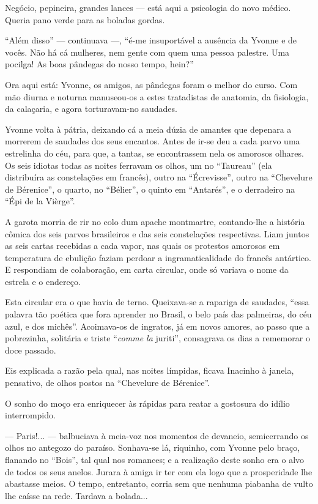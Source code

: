 Negócio, pepineira, grandes lances --- está aqui a psicologia do novo
médico. Queria pano verde para as boladas gordas.

``Além disso'' --- continuava ---, ``é-me insuportável a ausência da
Yvonne e de vocês. Não há cá mulheres, nem gente com quem uma pessoa
palestre. Uma pocilga! As boas pândegas do nosso tempo, hein?''

Ora aqui está: Yvonne, os amigos, as pândegas foram o melhor do curso.
Com mão diurna e noturna manuseou-os a estes tratadistas de anatomia, da
fisiologia, da calaçaria, e agora torturavam-no saudades.

Yvonne volta à pátria, deixando cá a meia dúzia de amantes que depenara
a morrerem de saudades dos seus encantos. Antes de ir-se deu a cada
parvo uma estrelinha do céu, para que, a tantas, se encontrassem nela os
amorosos olhares. Os seis idiotas todas as noites ferravam os olhos, um
no ``Taureau'' (ela distribuíra as constelações em francês), outro na
``Écrevisse'', outro na ``Chevelure de Bérenice'', o quarto, no
``Bélier'', o quinto em ``Antarés'', e o derradeiro na ``Épi de la
Vièrge''.

A garota morria de rir no colo dum apache montmartre, contando-lhe a
história cômica dos seis parvos brasileiros e das seis constelações
respectivas. Liam juntos as seis cartas recebidas a cada vapor, nas
quais os protestos amorosos em temperatura de ebulição faziam perdoar a
ingramaticalidade do francês antártico. E respondiam de colaboração, em
carta circular, onde só variava o nome da estrela e o endereço.

Esta circular era o que havia de terno. Queixava-se a rapariga de
saudades, ``essa palavra tão poética que fora aprender no Brasil, o belo
país das palmeiras, do céu azul, e dos michês''. Acoimava-os de
ingratos, já em novos amores, ao passo que a pobrezinha, solitária e
triste ``\emph{comme la} juriti'', consagrava os dias a rememorar o doce
passado.

Eis explicada a razão pela qual, nas noites límpidas, ficava Inacinho à
janela, pensativo, de olhos postos na ``Chevelure de Bérenice''.

O sonho do moço era enriquecer às rápidas para reatar a gostosura do
idílio interrompido.

--- Paris!... --- balbuciava à meia-voz nos momentos de devaneio,
semicerrando os olhos no antegozo do paraíso. Sonhava-se lá, riquinho,
com Yvonne pelo braço, flanando no ``Bois'', tal qual nos romances; e a
realização deste sonho era o alvo de todos os seus anelos. Jurara à
amiga ir ter com ela logo que a prosperidade lhe abastasse meios. O
tempo, entretanto, corria sem que nenhuma piabanha de vulto lhe caísse
na rede. Tardava a bolada...


